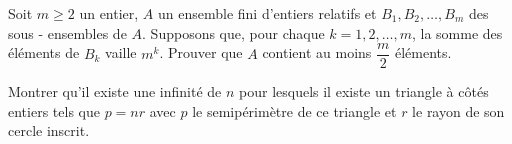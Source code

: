 \begin{exo}
Soit $m\ge 2$ un entier, $A$ un ensemble fini d'entiers relatifs et $B_1, B_2, \dots , B_m$ des sous - ensembles de $A$. Supposons que, pour chaque $k = 1, 2, \dots , m$, la somme des éléments de $B_k$ vaille $m^k$. Prouver que $A$ contient au moins $\dfrac m2$ éléments.
\end{exo}


\begin{exo}
Montrer qu'il existe une infinité de $n$ pour lesquels il existe un triangle à côtés entiers tels que $p = nr$ avec $p$ le semipérimètre de ce triangle et $r$ le rayon de son cercle inscrit.
\end{exo}


